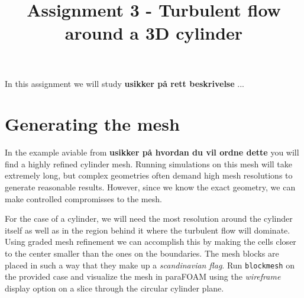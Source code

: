 \documentclass[a4paper,english,12pt]{article}
\begin{document}
\title{Assignment 3 - Turbulent flow around a 3D cylinder}
\author{}
\date{}
\maketitle

In this assignment we will study \textbf{usikker på rett beskrivelse} ... 

\section*{Generating the mesh}

In the example aviable from \textbf{usikker på hvordan du vil ordne dette} you will find a highly refined cylinder mesh. Running simulations on this mesh will take extremely long, but complex
geometries often demand high mesh resolutions to generate reasonable results. However, since we know the exact geometry, we can make controlled compromisses to the mesh. 

For the case of a cylinder, we will need the most resolution around the cylinder itself as well as in the region behind it where the turbulent flow will dominate. 
Using graded mesh refinement we can accomplish this by making the cells closer to the center smaller than the ones on the boundaries. The mesh blocks are placed in such a way that they make
up a \textit{scandinavian flag}. Run \verb+blockmesh+ on the provided case and visualize the mesh in paraFOAM using the \textit{wireframe} display option on a slice through the circular 
cylinder plane.
\end{document}
